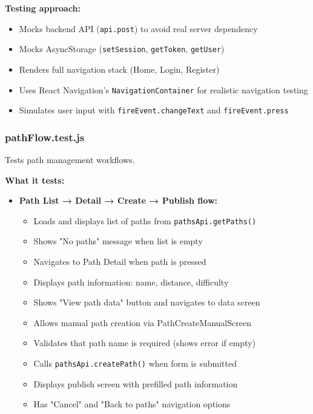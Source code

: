 \textbf{Testing approach:}
\begin{itemize}
    \item Mocks backend API (\texttt{api.post}) to avoid real server dependency
    \item Mocks AsyncStorage (\texttt{setSession}, \texttt{getToken}, \texttt{getUser})
    \item Renders full navigation stack (Home, Login, Register)
    \item Uses React Navigation's \texttt{NavigationContainer} for realistic navigation testing
    \item Simulates user input with \texttt{fireEvent.changeText} and \texttt{fireEvent.press}
\end{itemize}

\subsubsection{pathFlow.test.js}
\label{subsubsec:path_flow_test}

Tests path management workflows.

\textbf{What it tests:}
\begin{itemize}
    \item \textbf{Path List → Detail → Create → Publish flow:}
    \begin{itemize}
        \item Loads and displays list of paths from \texttt{pathsApi.getPaths()}
        \item Shows "No paths" message when list is empty
        \item Navigates to Path Detail when path is pressed
        \item Displays path information: name, distance, difficulty
        \item Shows "View path data" button and navigates to data screen
        \item Allows manual path creation via PathCreateManualScreen
        \item Validates that path name is required (shows error if empty)
        \item Calls \texttt{pathsApi.createPath()} when form is submitted
        \item Displays publish screen with prefilled path information
        \item Has "Cancel" and "Back to paths" navigation options
    \end{itemize}
\end{itemize}


